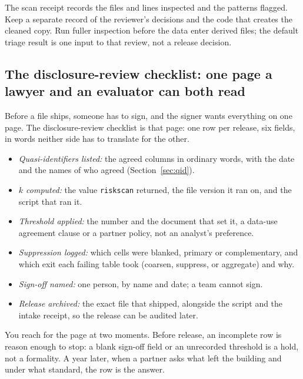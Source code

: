 \documentclass[
    a4paper,
    fontsize=10pt,
    twoside=true,
    numbers=noenddot,
]{kaobook}
\begin{document}
The scan receipt records the files and lines inspected and the patterns flagged. Keep a separate record of the reviewer's decisions and the code that creates the cleaned copy. Run fuller inspection before the data enter derived files; the default triage result is one input to that review, not a release decision.

\subsection{The disclosure-review checklist: one page a lawyer and an evaluator can both read}\label{ch14-sc-checklist}
Before a file ships, someone has to sign, and the signer wants everything on one page. The disclosure-review checklist is that page: one row per release, six fields, in words neither side has to translate for the other.
\begin{itemize}
\item \emph{Quasi-identifiers listed:} the agreed columns in ordinary words, with the date and the names of who agreed (Section~\ref{sec:qid}).
\item \emph{$k$ computed:} the value \texttt{riskscan} returned, the file version it ran on, and the script that ran it.
\item \emph{Threshold applied:} the number and the document that set it, a data-use agreement clause or a partner policy, not an analyst's preference.
\item \emph{Suppression logged:} which cells were blanked, primary or complementary, and which exit each failing table took (coarsen, suppress, or aggregate) and why.
\item \emph{Sign-off named:} one person, by name and date; a team cannot sign.
\item \emph{Release archived:} the exact file that shipped, alongside the script and the intake receipt, so the release can be audited later.
\end{itemize}
You reach for the page at two moments. Before release, an incomplete row is reason enough to stop: a blank sign-off field or an unrecorded threshold is a hold, not a formality. A year later, when a partner asks what left the building and under what standard, the row is the answer.
\end{document}
